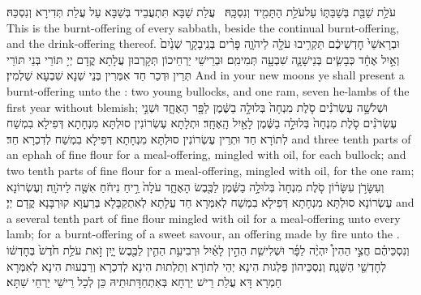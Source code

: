 {עֹלַ֥ת שַׁבַּ֖ת בְּשַׁבַּתּ֑וֹ עַל\maqqaf עֹלַ֥ת הַתָּמִ֖יד וְנִסְכָּֽהּ׃ \petucha }
{עֲלַת שַׁבָּא תִּתְעֲבֵיד בְּשַׁבָּא עַל עֲלַת תְּדִירָא וְנִסְכַּהּ׃}
{This is the burnt-offering of every sabbath, beside the continual burnt-offering, and the drink-offering thereof.}{}
{וּבְרָאשֵׁי֙ חׇדְשֵׁיכֶ֔ם תַּקְרִ֥יבוּ עֹלָ֖ה לַיהֹוָ֑ה פָּרִ֨ים בְּנֵֽי\maqqaf בָקָ֤ר שְׁנַ֙יִם֙ וְאַ֣יִל אֶחָ֔ד כְּבָשִׂ֧ים בְּנֵי\maqqaf שָׁנָ֛ה שִׁבְעָ֖ה תְּמִימִֽם׃}
{וּבְרֵישֵׁי יַרְחֵיכוֹן תְּקָרְבוּן עֲלָתָא קֳדָם יְיָ תּוֹרֵי בְּנֵי תּוֹרֵי תְּרֵין וּדְכַר חַד אִמְּרִין בְּנֵי שְׁנָא שִׁבְעָא שַׁלְמִין׃}
{And in your new moons ye shall present a burnt-offering unto the \lord: two young bullocks, and one ram, seven he-lambs of the first year without blemish;}{}
{וּשְׁלֹשָׁ֣ה עֶשְׂרֹנִ֗ים סֹ֤לֶת מִנְחָה֙ בְּלוּלָ֣ה בַשֶּׁ֔מֶן לַפָּ֖ר הָאֶחָ֑ד וּשְׁנֵ֣י עֶשְׂרֹנִ֗ים סֹ֤לֶת מִנְחָה֙ בְּלוּלָ֣ה בַשֶּׁ֔מֶן לָאַ֖יִל הָֽאֶחָֽד׃}
{וּתְלָתָא עֶשְׂרוֹנִין סוּלְתָּא מִנְחָתָא דְּפִילָא בִמְשַׁח לְתוֹרָא חַד וּתְרֵין עֶשְׂרוֹנִין סוּלְתָּא מִנְחָתָא דְּפִילָא בִמְשַׁח לְדִכְרָא חַד׃}
{and three tenth parts of an ephah of fine flour for a meal-offering, mingled with oil, for each bullock; and two tenth parts of fine flour for a meal-offering, mingled with oil, for the one ram;}{}
{וְעִשָּׂרֹ֣ן עִשָּׂר֗וֹן סֹ֤לֶת מִנְחָה֙ בְּלוּלָ֣ה בַשֶּׁ֔מֶן לַכֶּ֖בֶשׂ הָאֶחָ֑ד עֹלָה֙ רֵ֣יחַ נִיחֹ֔חַ אִשֶּׁ֖ה לַיהֹוָֽה׃}
{וְעֶשְׂרוֹנָא עֶשְׂרוֹנָא סוּלְתָּא מִנְחָתָא דְּפִילָא בִמְשַׁח לְאִמְּרָא חַד עֲלָתָא לְאִתְקַבָּלָא בְּרַעֲוָא קוּרְבָּנָא קֳדָם יְיָ׃}
{and a several tenth part of fine flour mingled with oil for a meal-offering unto every lamb; for a burnt-offering of a sweet savour, an offering made by fire unto the \lord.}{}
{וְנִסְכֵּיהֶ֗ם חֲצִ֣י הַהִין֩ יִהְיֶ֨ה לַפָּ֜ר וּשְׁלִישִׁ֧ת הַהִ֣ין לָאַ֗יִל וּרְבִיעִ֥ת הַהִ֛ין לַכֶּ֖בֶשׂ יָ֑יִן זֹ֣את עֹלַ֥ת חֹ֙דֶשׁ֙ בְּחׇדְשׁ֔וֹ לְחׇדְשֵׁ֖י הַשָּׁנָֽה׃}
{וְנִסְכֵּיהוֹן פַּלְגוּת הִינָא יְהֵי לְתוֹרָא וְתַלְתוּת הִינָא לְדִכְרָא וְרַבְעוּת הִינָא לְאִמְּרָא חַמְרָא דָּא עֲלַת רֵישׁ יַרְחָא בְּאִתְחַדָּתוּתֵיהּ כֵּן לְכָל רֵישֵׁי יַרְחֵי שַׁתָּא׃}
